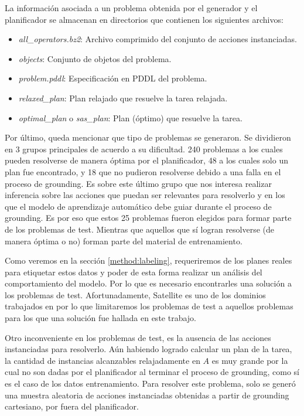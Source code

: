La información asociada a un problema obtenida por el generador y el
planificador se almacenan en directorios que contienen los siguientes archivos:

\begin{itemize}
    \item \emph{all\_operators.bz2}: Archivo comprimido del conjunto de acciones
    instanciadas.
    \item \emph{objects}: Conjunto de objetos del problema.
    \item \emph{problem.pddl}: Especificación en PDDL del problema.
    \item \emph{relaxed\_plan}: Plan relajado que resuelve la tarea relajada.
    \item \emph{optimal\_plan} o \emph{sas\_plan}: Plan (óptimo) que resuelve la
    tarea.
\end{itemize}

Por último, queda mencionar que tipo de problemas se generaron. Se dividieron en
3 grupos principales de acuerdo a su dificultad. 240 problemas a los cuales
pueden resolverse de manera óptima por el planificador, 48 a los cuales solo un
plan fue encontrado, y 18 que no pudieron resolverse debido a una falla en el
proceso de grounding. Es sobre este último grupo que nos interesa realizar
inferencia sobre las acciones que puedan ser relevantes para resolverlo y en los
que el modelo de aprendizaje automático debe guiar durante el proceso de
grounding. Es por eso que estos 25 problemas fueron elegidos para formar parte
de los problemas de test. Mientras que aquellos que sí logran resolverse (de
manera óptima o no) forman parte del material de entrenamiento.

Como veremos en la sección \ref{method:labeling}, requeriremos de los planes
reales para etiquetar estos datos y poder de esta forma realizar un análisis del
comportamiento del modelo. Por lo que es necesario encontrarles una solución a
los problemas de test. Afortunadamente, Satellite es uno de los dominios
trabajados en \citep{Gnad_Torralba_Dominguez_Areces_Bustos_2019} por lo que
limitaremos los problemas de test a aquellos problemas para los que una
solución fue hallada en este trabajo.

Otro inconveniente en los problemas de test, es la ausencia de las acciones
instanciadas para resolverlo. Aún habiendo logrado calcular un plan de la tarea,
la cantidad de instancias alcanzables relajadamente en $A$ es muy grande por la
cual no son dadas por el planificador al terminar el proceso de grounding, como
sí es el caso de los datos entrenamiento. Para resolver este problema, solo se generó
una muestra aleatoria de acciones instanciadas obtenidas a partir de grounding
cartesiano, por fuera del planificador.

